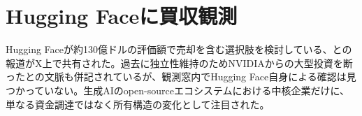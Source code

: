 \section{Hugging Faceに買収観測}
Hugging Faceが約130億ドルの評価額で売却を含む選択肢を検討している、との報道がX上で共有された。過去に独立性維持のためNVIDIAからの大型投資を断ったとの文脈も併記されているが、観測窓内でHugging Face自身による確認は見つかっていない。生成AIのopen-sourceエコシステムにおける中核企業だけに、単なる資金調達ではなく所有構造の変化として注目された。
